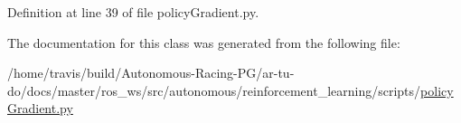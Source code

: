 Definition at line 39 of file policy\+Gradient.\+py.



The documentation for this class was generated from the following file\+:\begin{DoxyCompactItemize}
\item 
/home/travis/build/\+Autonomous-\/\+Racing-\/\+P\+G/ar-\/tu-\/do/docs/master/ros\+\_\+ws/src/autonomous/reinforcement\+\_\+learning/scripts/\hyperlink{policy_gradient_8py}{policy\+Gradient.\+py}\end{DoxyCompactItemize}
